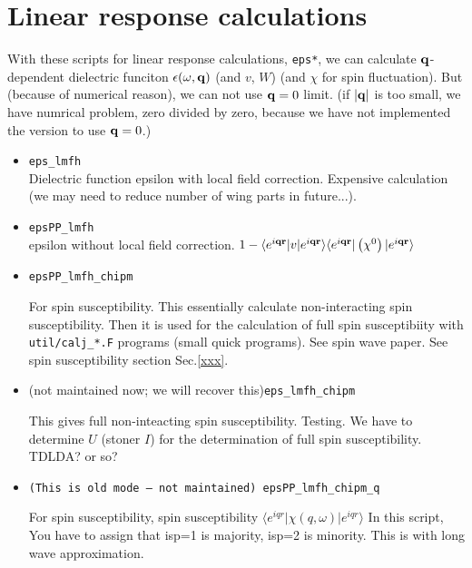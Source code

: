 \documentclass[a4paper,10pt,epsf,fleqn]{article}
\newcommand{\bfq}{{\bf q}}
\newcommand{\bfr}{{\bf r}}
\newcommand{\raw}[1]{{\tt #1}}
\newcommand{\eiqr}{e^{i \bfq \bfr}}
\begin{document}
\newpage
\section{Linear response calculations}
\label{linearr}
With these scripts for linear response calculations, \verb#eps*#,
we can calculate
$\bfq$-dependent dielectric funciton
$\epsilon(\omega ,\bfq)$ (and $v$, $W$) (and $\chi$ for spin fluctuation).
But (because of numerical reason), we can not use $\bfq = 0$ limit.
(if $|\bfq|$ is too small, we have numrical problem, zero divided by
zero, because we have not implemented the version to use $\bfq=0$.)
\begin{itemize}
\item \raw{eps\_lmfh}\\
   Dielectric function epsilon with local field correction.
   Expensive calculation (we may need to reduce number of wing parts in
      future...).

\item \raw{epsPP\_lmfh}\\
   epsilon without local field correction.
   $1- \langle \eiqr |v|\eiqr\rangle  \langle \eiqr| \left( \chi^{0} \right) |\eiqr\rangle$


\item \raw{epsPP\_lmfh\_chipm}

    For spin susceptibility. This essentially calculate non-interacting spin susceptibility.
    Then it is used for the calculation of full spin susceptibiity with \verb#util/calj_*.F# programs
    (small quick programs). See spin wave paper.
    See spin susceptibility section Sec.\ref{xxx}.

\item (not maintained now; we will recover this)\raw{eps\_lmfh\_chipm}

    This gives full non-inteacting spin susceptibility. Testing.
    We have to determine $U$ (stoner $I$) for the determination of full spin susceptibility.
    TDLDA? or so?


\item \raw{(This is old mode --- not maintained) epsPP\_lmfh\_chipm\_q}

  For spin susceptibility, 
  spin susceptibility $\langle e^{iqr}| \chi(q,\omega) |e^{iqr} \rangle$
  In this script, You have to assign that isp=1 is majority, isp=2 is minority.
  This is with long wave approximation.  

\end{itemize}
\end{document}
